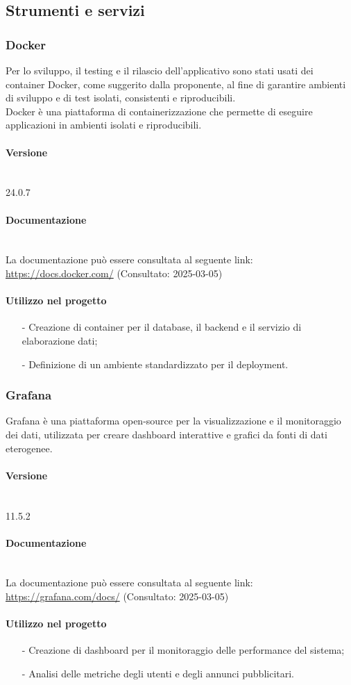 \documentclass[10pt]{article}
\newcommand{\myparagraph}[1]{\paragraph{#1}\mbox{}\\\vspace{0.4em}}
\begin{document}
\begin{justify}
\subsection{Strumenti e servizi}
\label{sec:strumenti}

    \subsubsection{Docker}
    Per lo sviluppo, il testing e il rilascio dell'applicativo sono stati usati dei container Docker, come suggerito dalla proponente, al fine di garantire ambienti di sviluppo e di test isolati, consistenti e riproducibili.\\
    Docker è una piattaforma di containerizzazione che permette di eseguire applicazioni in ambienti isolati e riproducibili.
    
    \myparagraph{Versione}  
    24.0.7 %

    \myparagraph{Documentazione}
    La documentazione può essere consultata al seguente link: \textcolor{blue}{\url{https://docs.docker.com/}} (Consultato: 2025-03-05)

    \paragraph{Utilizzo nel progetto}
    \begin{itemize}
        \item[-] Creazione di container per il database, il backend e il servizio di elaborazione dati;
        \item[-] Definizione di un ambiente standardizzato per il deployment.
    \end{itemize}

    \subsubsection{Grafana}
    Grafana è una piattaforma open-source per la visualizzazione e il monitoraggio dei dati, utilizzata per creare dashboard interattive e grafici da fonti di dati eterogenee.
    
    \myparagraph{Versione} 
    11.5.2 
    
    \myparagraph{Documentazione} 
    La documentazione può essere consultata al seguente link: \textcolor{blue}{\url{https://grafana.com/docs/}} (Consultato: 2025-03-05)
    
    \paragraph{Utilizzo nel progetto}
    \begin{itemize}
        \item[-] Creazione di dashboard per il monitoraggio delle performance del sistema;
        \item[-] Analisi delle metriche degli utenti e degli annunci pubblicitari.
    \end{itemize}


\end{justify}
\end{document}
